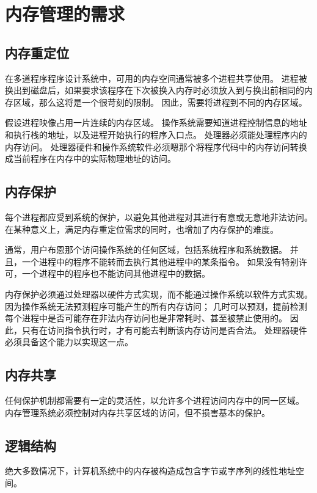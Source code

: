 
\section{内存管理的需求}
{
    \subsection{内存重定位}
    {
        在多道程序程序设计系统中，可用的内存空间通常被多个进程共享使用。
        进程被换出到磁盘后，如果要求该程序在下次被换入内存时必须放入到与换出前相同的内存区域，那么这将是一个很苛刻的限制。
        因此，需要将进程到不同的内存区域。

        假设进程映像占用一片连续的内存区域。
        操作系统需要知道进程控制信息的地址和执行栈的地址，以及进程开始执行的程序入口点。
        处理器必须能处理程序内的内存访问。
        处理器硬件和操作系统软件必须嗯那个将程序代码中的内存访问转换成当前程序在内存中的实际物理地址的访问。
    }

    \subsection{内存保护}
    {
        每个进程都应受到系统的保护，以避免其他进程对其进行有意或无意地非法访问。
        在某种意义上，满足内存重定位需求的同时，也增加了内存保护的难度。

        通常，用户布恩那个访问操作系统的任何区域，包括系统程序和系统数据。
        并且，一个进程中的程序不能转而去执行其他进程中的某条指令。
        如果没有特别许可，一个进程中的程序也不能访问其他进程中的数据。

        内存保护必须通过处理器以硬件方式实现，而不能通过操作系统以软件方式实现。
        因为操作系统无法预测程序可能产生的所有内存访问；
        几时可以预测，提前检测每个进程中是否可能存在非法内存访问也是非常耗时、甚至被禁止使用的。
        因此，只有在访问指令执行时，才有可能去判断该内存访问是否合法。
        处理器硬件必须具备这个能力以实现这一点。
    }

    \subsection{内存共享}
    {
        任何保护机制都需要有一定的灵活性，以允许多个进程访问内存中的同一区域。
        内存管理系统必须控制对内存共享区域的访问，但不损害基本的保护。
    }

    \subsection{逻辑结构}
    {
        绝大多数情况下，计算机系统中的内存被构造成包含字节或字序列的线性地址空间。

}}
